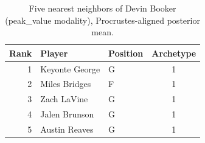 \begin{table}[htbp]
  \centering\small
  \begin{tabular}{rllc}
    \toprule
    Rank & Player & Position & Archetype \\
    \midrule
    1 & Keyonte George & G & 1 \\
    2 & Miles Bridges & F & 1 \\
    3 & Zach LaVine & G & 1 \\
    4 & Jalen Brunson & G & 1 \\
    5 & Austin Reaves & G & 1 \\
    \bottomrule
  \end{tabular}
  \caption{Five nearest neighbors of Devin Booker (peak_value modality), Procrustes-aligned posterior mean.}
  \label{tab:Devin_Booker_neighbors_peak_value}
\end{table}

